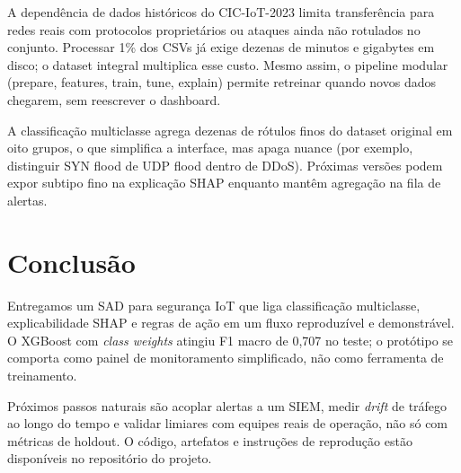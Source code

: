 \documentclass[12pt]{article}
\begin{document}
A dependência de dados históricos do CIC-IoT-2023 limita transferência para redes reais com protocolos proprietários ou ataques ainda não rotulados no conjunto.
Processar 1\% dos CSVs já exige dezenas de minutos e gigabytes em disco; o dataset integral multiplica esse custo.
Mesmo assim, o pipeline modular (prepare, features, train, tune, explain) permite retreinar quando novos dados chegarem, sem reescrever o dashboard.

A classificação multiclasse agrega dezenas de rótulos finos do dataset original em oito grupos, o que simplifica a interface, mas apaga nuance (por exemplo, distinguir SYN flood de UDP flood dentro de DDoS).
Próximas versões podem expor subtipo fino na explicação SHAP enquanto mantêm agregação na fila de alertas.

\section{Conclusão}

Entregamos um SAD para segurança IoT que liga classificação multiclasse, explicabilidade SHAP e regras de ação em um fluxo reproduzível e demonstrável.
O XGBoost com \textit{class weights} atingiu F1 macro de 0,707 no teste; o protótipo se comporta como painel de monitoramento simplificado, não como ferramenta de treinamento.

Próximos passos naturais são acoplar alertas a um SIEM, medir \textit{drift} de tráfego ao longo do tempo e validar limiares com equipes reais de operação, não só com métricas de holdout.
O código, artefatos e instruções de reprodução estão disponíveis no repositório do projeto.



\end{document}

